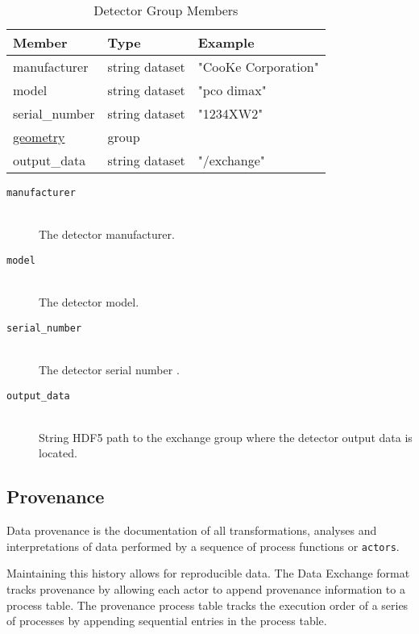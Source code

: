 \begin{table}[h!]\sffamily \footnotesize
\caption{Detector Group Members}

\begin{tabular}{p{3.5cm} p{4.7cm}  p{4.5cm} }
\toprule
\bfseries Member     & \bfseries Type & \bfseries Example \\
\midrule
manufacturer & string dataset & "CooKe Corporation" \\   
model & string dataset &  "pco dimax" \\
serial\_number & string dataset &  "1234XW2" \\  
\hyperref[table:geometry]{geometry} &  group & \\
output\_data & string dataset & "/exchange" \\
\bottomrule
\end{tabular}
\end{table}

\begin{description}
\item[\tt {manufacturer}] \hfill \\
{The detector manufacturer.}

\item[\tt {model}] \hfill \\
{The detector model.}

\item[\tt {serial\_number}] \hfill \\
{The detector serial number .}

\item[\tt {output\_data}] \hfill \\
{String HDF5 path to the exchange group where the detector output data is located.}
\end{description}

\newpage

\subsection{Provenance}
\label{section:provenance}

Data provenance is the documentation of all transformations, analyses and 
interpretations of data performed by a sequence of process functions or {\tt {actors}}. 

Maintaining this history allows for reproducible data. The Data Exchange format 
tracks provenance by allowing each actor to append provenance information to a process table. 
The provenance process table tracks the execution order of a series of processes
by appending sequential entries in the process table.

